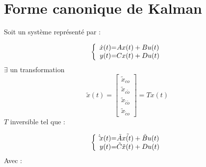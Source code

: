 {{{{{{\section{Forme canonique de Kalman}
Soit un système représenté par :
\large{
    \[
\left \{
\begin{array}{c @{=} c}
    \dot x(t) & Ax(t) + Bu(t)\\
    y(t) & Cx(t) + Du(t)
\end{array}
\right.
\]
$\exists$ un transformation 
\[ \tilde{x}(t) =
\begin{bmatrix}
    \tilde{x}_{co} \\
    \tilde{x}_{c\tilde{o}} \\
    \tilde{x}_{\tilde{c}\tilde{o}} \\
    \tilde{x}_{\tilde{c}o} 
\end{bmatrix}
= Tx(t)\]
$T$ inversible tel que : \newline
\large{
    \[
\left \{
\begin{array}{c @{=} c}
    \dot \tilde{x}(t) & \tilde{A}\tilde{x(t)} + \tilde{B}u(t)\\
    y(t) & \tilde{C}\tilde{x}(t) + Du(t)
\end{array}
\right.
\]
Avec :
}}}}}}}}
